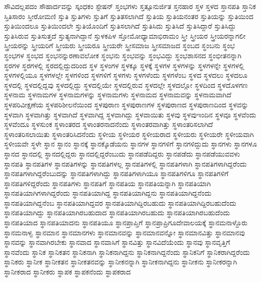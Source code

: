 {ಸೌವಿದಲ್ಲಪದಂ
ಸೌಹಾರ್ದವನ್ನು
ಸ್ಕಂಧಕಂ
ಸ್ಟೇಷನ್
ಸ್ತಂಭಗಳು
ಸ್ತತ್ಸೂನುರ್ಜಿತ
ಸ್ತನಹಾರ
ಸ್ತಳ
ಸ್ತಳದ
ಸ್ತಾನಪತಿ
ಸ್ತಾನಿಕ
ಸ್ತಿತಿಸಾರಂ
ಸ್ತೀರೋಮಣಿ
ಸ್ತುತಿ
ಸ್ತುತಿಗಳು
ಸ್ತುತಿಗೆ
ಸ್ತುತಿತಸಲಾಗಿದೆ
ಸ್ತುತಿಯ
ಸ್ತುತಿಯನಂತರ
ಸ್ತುತಿಯನ್ನು
ಸ್ತುತಿಯಿಂದ
ಸ್ತುತಿಯಿಂದಲೂ
ಸ್ತುತಿಯಿಂದಲೇ
ಸ್ತುತಿಯೊಂದಿಗೆ
ಸ್ತುತಿಸಲಾಗಿದೆ
ಸ್ತುತಿಸಿದು
ಸ್ತುತಿಸಿದೆ
ಸ್ತುತಿಸಿದ್ದಾರೆ
ಸ್ತುತಿಸಿದ್ದು
ಸ್ತುತಿಸಿರುವ
ಸ್ತುತಿಸುತ್ತದೆ
ಸ್ತುತ್ಯನಾಗಿದ್ದಾನೆ
ಸ್ತುಳಕಪಿಳ
ಸ್ತೋಮೋಧ್ಯಾಮಾಭಿರಾಮಂ
ಸ್ತ್ರೀ
ಸ್ತ್ರೀಯರ
ಸ್ತ್ರೀಯರನ್ನಾಗಲೀ
ಸ್ತ್ರೀಯರನ್ನು
ಸ್ತ್ರೀಯರಿಗೆ
ಸ್ತ್ರೀಯರು
ಸ್ತ್ರೀಯರೂ
ಸ್ತ್ರೀಯರೇ
ಸ್ತ್ರೀಸಮಾಜ
ಸ್ತ್ರೀಸಮಾಜದ
ಸ್ಥಂಬದ
ಸ್ಥಂಬನು
ಸ್ಥಂಭ
ಸ್ಥಂಭಗಳ
ಸ್ಥಂಭದ
ಸ್ಥಂಭನನ್ನುರಣಾವಲೋಕ
ಸ್ಥಂಭನು
ಸ್ಥಂಭವನ್ನು
ಸ್ಥಂಭವಿದ್ದು
ಸ್ಥಂಭಶಾಸನದ
ಸ್ಥಂಭೀತನನ್ನಾಗಿ
ಸ್ಥರಗಳ
ಸ್ಥರಗಳಲ್ಲಿ
ಸ್ಥರದಲ್ಲಿದ್ದುದರಿಂದ
ಸ್ಥಳ
ಸ್ಥಳಂಗಳ
ಸ್ಥಳಕ್ಕೂ
ಸ್ಥಳಕ್ಕೆ
ಸ್ಥಳಗಳ
ಸ್ಥಳಗಳನ್ನು
ಸ್ಥಳಗಳನ್ನೇ
ಸ್ಥಳಗಳಲ್ಲಿ
ಸ್ಥಳಗಳಲ್ಲಿಯೂ
ಸ್ಥಳಗಳಲ್ಲೇ
ಸ್ಥಳಗಳಿಂದ
ಸ್ಥಳಗಳಿಗೆ
ಸ್ಥಳಗಳು
ಸ್ಥಳಗಳೆಂದು
ಸ್ಥಳಗಳೆಂಬ
ಸ್ಥಳದ
ಸ್ಥಳದಲು
ಸ್ಥಳದಲೂ
ಸ್ಥಳದಲ್ಲಿ
ಸ್ಥಳದಲ್ಲಿದ್ದವು
ಸ್ಥಳದಲ್ಲಿದ್ದು
ಸ್ಥಳದಲ್ಲಿಯೇ
ಸ್ಥಳದಲ್ಲಿರುವ
ಸ್ಥಳದಲ್ಲೇ
ಸ್ಥಳದಲ್ಲೋ
ಸ್ಥಳದಿಂದ
ಸ್ಥಳದೊಳಗಣ
ಸ್ಥಳನಾಮ
ಸ್ಥಳನಾಮಗಳ
ಸ್ಥಳನಾಮಗಳನ್ನು
ಸ್ಥಳನಾಮಗಳು
ಸ್ಥಳನಾಮದ
ಸ್ಥಳನಾಮವನ್ನು
ಸ್ಥಳನಾಮವಾಗಿದೆ
ಸ್ಥಳಪರಿವೀಕ್ಷಣೆಯ
ಸ್ಥಳಪರಿಶೀಲನೆಯಿಂದ
ಸ್ಥಳಪುರಾಣ
ಸ್ಥಳಪುರಾಣಗಳ
ಸ್ಥಳಪುರಾಣದ
ಸ್ಥಳಪುರಾಣದಿಂದ
ಸ್ಥಳವನ್ನು
ಸ್ಥಳವಾಗಿ
ಸ್ಥಳವಾಗಿತ್ತು
ಸ್ಥಳವಾಗಿದೆ
ಸ್ಥಳವಾಗಿದ್ದ
ಸ್ಥಳವಾಗಿದ್ದು
ಸ್ಥಳವಾಯಿತು
ಸ್ಥಳವು
ಸ್ಥಳವುಇಂದಿನ
ಸ್ಥಳವೂ
ಸ್ಥಳವೆಂದು
ಸ್ಥಳವೆಂದೂ
ಸ್ಥಳಸುಂಕ
ಸ್ಥಳಾಂತರದ
ಸ್ಥಳಾಂತರನಾದನೆಂದು
ಸ್ಥಳಾಂತರವಾಗಿತ್ತು
ಸ್ಥಳಾಂತರಿಸಲಾಗಿದೆ
ಸ್ಥಳಾಂತರಿಸಲಾಯಿತು
ಸ್ಥಳಾಂತರಿಸಿದನೆಂದು
ಸ್ಥಳೀಯ
ಸ್ಥಳೀಯರ
ಸ್ಥಳೀಯರಾದ
ಸ್ಥಳೀಯರು
ಸ್ಥಳೀಯರೇ
ಸ್ಥಳೀಯವಾಗಿ
ಸ್ಥಳೀಯವೇ
ಸ್ಥಳೇ
ಸ್ಥಾನ
ಸ್ಥಾನಂ
ಸ್ಥಾನಕ್ಕೆ
ಸ್ಥಾನಕ್ಕೊಡೆಯನು
ಸ್ಥಾನಗಳ
ಸ್ಥಾನಗಳಿಗೆ
ಸ್ಥಾನಗಳಿದ್ದುದು
ಸ್ಥಾನಗಳು
ಸ್ಥಾನಗಳೂ
ಸ್ಥಾನದ
ಸ್ಥಾನದಲ್ಲಿ
ಸ್ಥಾನದಲ್ಲಿದ್ದರು
ಸ್ಥಾನದಲ್ಲಿದ್ದರೆಂಬುದು
ಸ್ಥಾನಪಡೆದಿದ್ದರು
ಸ್ಥಾನಪಡೆದು
ಸ್ಥಾನಪಡೆಯುವವಳು
ಸ್ಥಾನಪತಿ
ಸ್ಥಾನಪತಿಗಳ
ಸ್ಥಾನಪತಿಗಳನ್ನು
ಸ್ಥಾನಪತಿಗಳಲ್ಲ
ಸ್ಥಾನಪತಿಗಳಲ್ಲಿ
ಸ್ಥಾನಪತಿಗಳಾಗಿ
ಸ್ಥಾನಪತಿಗಳಾಗಿದ್ದರೆಂದು
ಸ್ಥಾನಪತಿಗಳಾಗಿದ್ದರೆಂಬುದನ್ನು
ಸ್ಥಾನಪತಿಗಳಾಗಿದ್ದು
ಸ್ಥಾನಪತಿಗಳಾಗಿಯೂ
ಸ್ಥಾನಪತಿಗಳಿಗೂ
ಸ್ಥಾನಪತಿಗಳಿಗೆ
ಸ್ಥಾನಪತಿಗಳಿದ್ದರೆಂದು
ಸ್ಥಾನಪತಿಗಳು
ಸ್ಥಾನಪತಿಗೆ
ಸ್ಥಾನಪತಿಯ
ಸ್ಥಾನಪತಿಯನ್ನಾಗಿ
ಸ್ಥಾನಪತಿಯಾಗಿ
ಸ್ಥಾನಪತಿಯಾಗಿಗಳಾಗಿದ್ದರೆಂದು
ಸ್ಥಾನಪತಿಯಾಗಿದ್ದ
ಸ್ಥಾನಪತಿಯಾಗಿದ್ದನು
ಸ್ಥಾನಪತಿಯಾಗಿದ್ದನೆಂದು
ಸ್ಥಾನಪತಿಯಾಗಿದ್ದನೆಂಬ
ಸ್ಥಾನಪತಿಯಾಗಿದ್ದವರ
ಸ್ಥಾನಪತಿಯಾಗಿದ್ದಿರಬಹುದು
ಸ್ಥಾನಪತಿಯಾಗಿದ್ದಿರಬಹುದೆಂದು
ಸ್ಥಾನಪತಿಯಾಗಿದ್ದು
ಸ್ಥಾನಪತಿಯಾಗಿರಬಹುದಾದ
ಸ್ಥಾನಪತಿಯಾಗಿರಬಹುದು
ಸ್ಥಾನಪತಿಯಾಗಿರಬಹುದೆಂದು
ಸ್ಥಾನಪತಿಯಾದ
ಸ್ಥಾನಪತಿಯಾದನು
ಸ್ಥಾನಪತಿಯೂ
ಸ್ಥಾನಪ್ರಾಪ್ತಿಗೆ
ಸ್ಥಾನಪ್ರಾಪ್ರಿಗೂದೇವಾಲಯಕ್ಕೆ
ಸ್ಥಾನಮನಾಳ್ದೊರು
ಸ್ಥಾನಮನಾಳ್ವ
ಸ್ಥಾನಮಾನ
ಸ್ಥಾನಮಾನಗಳು
ಸ್ಥಾನಮಾನವನ್ನು
ಸ್ಥಾನಮಾನವನ್ನೋ
ಸ್ಥಾನಮಾನವಿತ್ತು
ಸ್ಥಾನಮಾನವು
ಸ್ಥಾನವನ್ನು
ಸ್ಥಾನವಾಗಿರಬೇಕು
ಸ್ಥಾನವಾದ
ಸ್ಥಾನವಾಸಿಗೆ
ಸ್ಥಾನವಿತ್ತು
ಸ್ಥಾನವಿದೆಯೆಂದು
ಸ್ಥಾನವು
ಸ್ಥಾನವೃತ್ತಿಗೆ
ಸ್ಥಾನವೆಂದು
ಸ್ಥಾನಿಕ
ಸ್ಥಾನಿಕತನ
ಸ್ಥಾನಿಕನಾಗಿ
ಸ್ಥಾನಿಕನಾಗಿದ್ದನು
ಸ್ಥಾನಿಕನಾಗಿದ್ದನೆಂದು
ಸ್ಥಾನಿಕನಿಗೆ
ಸ್ಥಾನಿಕರಾಗಿದ್ದರೆಂದು
ಸ್ಥಾನಿಕರು
ಸ್ಥಾನೀಕ
ಸ್ಥಾನೀಕತನ
ಸ್ಥಾನೀಕತನವನ್ನು
ಸ್ಥಾನೀಕನನ್ನಾಗಿ
ಸ್ಥಾನೀಕನಾಗಿದ್ದನು
ಸ್ಥಾನೀಕನು
ಸ್ಥಾನೀಕರನ್ನಾಗಿ
ಸ್ಥಾನೀಕರಾದ
ಸ್ಥಾನೀಕರು
ಸ್ಥಾಪಕ
ಸ್ಥಾಪಕನೆಂದು
ಸ್ಥಾಪಕರಾದ
}
